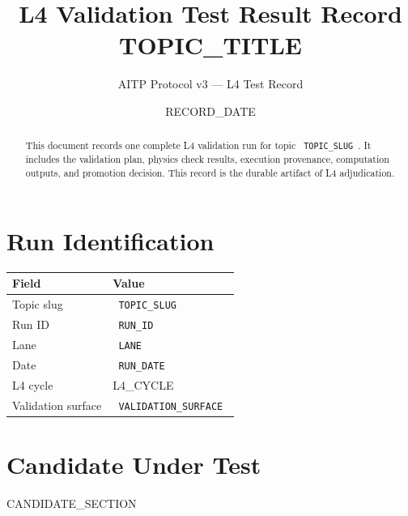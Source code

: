 \documentclass[11pt,a4paper]{article}
\title{\textbf{L4 Validation Test Result Record}\\[0.4em]
  \large {{TOPIC_TITLE}}}
\author{AITP Protocol v3 — L4 Test Record}
\date{ {{RECORD_DATE}} }
\begin{document}
\maketitle

\begin{abstract}
This document records one complete L4 validation run for topic
\texttt{ {{TOPIC_SLUG}} }. It includes the validation plan, physics check
results, execution provenance, computation outputs, and promotion decision.
This record is the durable artifact of L4 adjudication.
\end{abstract}

\tableofcontents
\newpage


\section{Run Identification}

\begin{infobox}
\begin{tabularx}{\linewidth}{@{}>{\raggedright\arraybackslash}p{3.5cm} >{\raggedright\arraybackslash}X@{}}
\toprule
\textbf{Field} & \textbf{Value} \\
\midrule
Topic slug       & \texttt{ {{TOPIC_SLUG}} } \\
Run ID           & \texttt{ {{RUN_ID}} } \\
Lane             & \texttt{ {{LANE}} } \\
Date             & \texttt{ {{RUN_DATE}} } \\
L4 cycle         & {{L4_CYCLE}} \\
Validation surface & \texttt{ {{VALIDATION_SURFACE}} } \\
\bottomrule
\end{tabularx}
\end{infobox}


\section{Candidate Under Test}

{{CANDIDATE_SECTION}}
\end{document}
